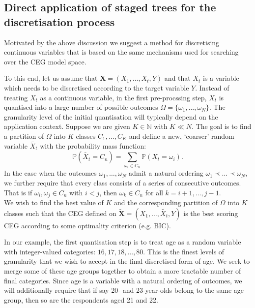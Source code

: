 \documentclass[runningheads]{llncs}
\begin{document}
\subsection{Direct application of staged trees for the discretisation process}

Motivated by the above discussion we suggest a method for discretising continuous variables that is based on the same mechanisms used for searching over the CEG model space. 

To this end, let us assume that $\boldsymbol{X} = (X_1, \ldots, X_t, Y)$ and that $X_t$ is a variable which needs to be discretised according to the target variable $Y$. Instead of treating $X_t$ as a continuous variable, in the first pre-procssing step, $X_t$ is quantised into a large number of possible outcomes  $\Omega = \{\omega_1, \ldots, \omega_N\}$. The granularity level of the initial quantisation will typically depend on the application context. Suppose we are given $K \in \mathbb{N}$ with $K \ll N$. The goal is to find a partition of $\Omega$ into $K$ classes 
$C_1, \ldots, C_K$ and define a new, `coarser' random variable $\tilde{X_t}$ with the probability mass function: \[\mathbb{P}(\tilde{X_t} = C_n) = \sum_{\omega_i \in C_n}\mathbb{P}(X_t  = \omega_i).\] 
In the case when the outcomes $\omega_1, \ldots, \omega_N$ admit a natural ordering $\omega_1\prec\ldots\prec\omega_N$, we further require that every class consists of a series of consecutive outcomes. That is if $\omega_{i}, \omega_{j} \in C_n$ with $i < j$, then $\omega_k \in C_n$ for all $k = i+1, \ldots, j-1$. \\
We wish to find the best value of $K$ and the corresponding partition of $\Omega$ into $K$ classes such that the CEG defined on $\boldsymbol{\tilde{X}} = (X_1, \ldots, \tilde{X_t}, Y)$ is the best scoring CEG according to some optimality criterion (e.g. BIC).

In our example, the first quantisation step is to treat age as a random variable with integer-valued categories: $16, 17, 18, \ldots , 80$. This is the finest levels of granularity that we wish to accept in the final discretised form of age. We seek to merge some of these age groups together to obtain a more tractable number of final categories. Since age is a variable with a natural ordering of outcomes, we will additionally require that if say 20- and 23-year-olds belong to the same age group, then so are the respondents aged 21 and 22. 
\end{document}

